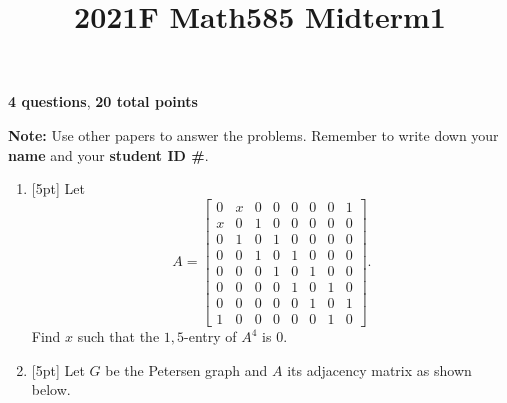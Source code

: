 \documentclass{article}
\title{2021F Math585 Midterm1}
\date{\vspace{-1cm}}
\begin{document}
\maketitle
\large

\textbf{4 questions}, \textbf{20 total points}

\textbf{Note:}  Use other papers to answer the problems.  Remember to write down your \textbf{name} and your \textbf{student ID \#}.

\begin{enumerate}
\setlength\itemsep{2em}

\item{} [5pt] Let 
\[A = \begin{bmatrix}
 0 & x & 0 & 0 & 0 & 0 & 0 & 1 \\
 x & 0 & 1 & 0 & 0 & 0 & 0 & 0 \\
 0 & 1 & 0 & 1 & 0 & 0 & 0 & 0 \\
 0 & 0 & 1 & 0 & 1 & 0 & 0 & 0 \\
 0 & 0 & 0 & 1 & 0 & 1 & 0 & 0 \\
 0 & 0 & 0 & 0 & 1 & 0 & 1 & 0 \\
 0 & 0 & 0 & 0 & 0 & 1 & 0 & 1 \\
 1 & 0 & 0 & 0 & 0 & 0 & 1 & 0
\end{bmatrix}.\]
Find $x$ such that the $1,5$-entry of $A^4$ is $0$.

\item{} [5pt] Let $G$ be the Petersen graph and $A$ its adjacency matrix as shown below.

\begin{figure}[h]
\begin{center}
\end{center}
\end{figure}
\end{enumerate}
\end{document}
